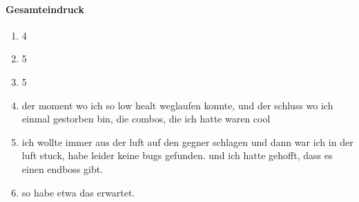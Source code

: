 \documentclass[../Main.tex]{subfiles}
\begin{document}
\paragraph{Gesamteindruck}
\begin{enumerate}[label=\textbf{Q\arabic*}, leftmargin=1.5cm, itemsep=0.5em, resume]
    \item 4
    \item 5
    \item 5
    \item der moment wo ich so low healt weglaufen konnte, und der schluss wo ich einmal gestorben bin, die combos, die ich hatte waren cool
    \item ich wollte immer aus der luft auf den gegner schlagen und dann war ich in der luft stuck, habe leider keine bugs gefunden. und ich hatte gehofft, dass es einen endboss gibt.
    \item so habe etwa das erwartet.
\end{enumerate}
\end{document}
